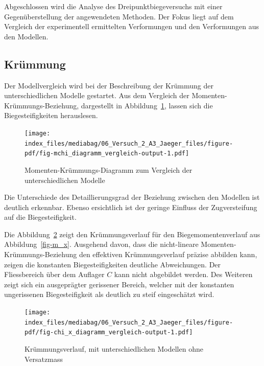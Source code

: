 \documentclass[
  12pt,
  letterpaper,
  egregdoesnotlikesansseriftitles]{scrreprt}
\begin{document}
Abgeschlossen wird die Analyse des Dreipunktbiegeversuchs mit einer
Gegenüberstellung der angewendeten Methoden. Der Fokus liegt auf dem
Vergleich der experimentell ermittelten Verformungen und den
Verformungen aus den Modellen.

\hypertarget{kruxfcmmung}{%
\subsection{Krümmung}\label{kruxfcmmung}}

Der Modellvergleich wird bei der Beschreibung der Krümmung der
unterschiedlichen Modelle gestartet. Aus dem Vergleich der
Momenten-Krümmungs-Beziehung, dargestellt in
Abbildung~\ref{fig-mchi_diagramm_vergleich}, lassen sich die
Biegesteifigkeiten herauslesen.

\begin{figure}[H]

{\centering \texttt{[image: index\_files/mediabag/06\_Versuch\_2\_A3\_Jaeger\_files/figure-pdf/fig-mchi\_diagramm\_vergleich-output-1.pdf]}

}

\caption{\label{fig-mchi_diagramm_vergleich}Momenten-Krümmungs-Diagramm
zum Vergleich der unterschiedlichen Modelle}

\end{figure}

Die Unterschiede des Detaillierungsgrad der Beziehung zwischen den
Modellen ist deutlich erkennbar. Ebenso ersichtlich ist der geringe
Einfluss der Zugversteifung auf die Biegesteifigkeit.

Die Abbildung~\ref{fig-chi_x_diagramm_vergleich} zeigt den
Krümmungsverlauf für den Biegemomentenverlauf aus
Abbildung~\ref{fig-m_x}. Ausgehend davon, dass die nicht-lineare
Momenten-Krümmungs-Beziehung den effektiven Krümmungsverlauf präzise
abbilden kann, zeigen die konstanten Biegesteifigkeiten deutliche
Abweichungen. Der Fliessbereich über dem Auflager \(C\) kann nicht
abgebildet werden. Des Weiteren zeigt sich ein ausgeprägter gerissener
Bereich, welcher mit der konstanten ungerissenen Biegesteifigkeit als
deutlich zu steif eingeschätzt wird.

\begin{figure}[H]

{\centering \texttt{[image: index\_files/mediabag/06\_Versuch\_2\_A3\_Jaeger\_files/figure-pdf/fig-chi\_x\_diagramm\_vergleich-output-1.pdf]}

}

\caption{\label{fig-chi_x_diagramm_vergleich}Krümmungsverlauf, mit
unterschiedlichen Modellen ohne Versatzmass}

\end{figure}
\end{document}

